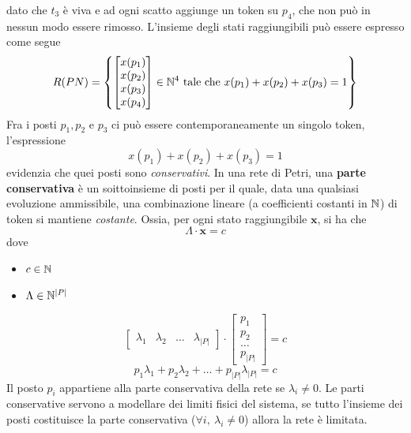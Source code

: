 \documentclass[10pt, letterpaper]{report}
\begin{document}
dato che $t_3$ è viva e ad ogni scatto aggiunge un token su $p_4$, che non può in nessun modo essere rimosso. L'insieme degli stati raggiungibili può essere espresso come segue 
$$ R(PN)= \left\{   \begin{bmatrix}x(p_1)\\x(p_2)\\x(p_3)\\x(p_4) \end{bmatrix} \in {\mathbb N}^4 \text{ tale che }x(p_1)+x(p_2)+x(p_3)=1  \right\}$$
Fra i posti $p_1,p_2$ e $p_3$ ci può essere contemporaneamente un singolo token, l'espressione 
$$ x(p_1)+x(p_2)+x(p_3)=1 $$
evidenzia che quei posti sono \textit{conservativi}. \acc 
{} In una rete di Petri, una \textbf{parte conservativa} è un soittoinsieme di posti per il quale, data una qualsiasi evoluzione ammissibile, una combinazione lineare (a coefficienti costanti in ${\mathbb N}$) di token si mantiene \textit{costante}. Ossia, per ogni stato raggiungibile $\mathbf x$, si ha che 
$$ \Lambda \cdot \mathbf x = c $$
dove \begin{itemize}
\item $c\in {\mathbb N}$\item$ \Lambda \in {\mathbb N}^{|P|}$
\end{itemize}
$$ \begin{bmatrix}
    \lambda_1 & \lambda_2 & \dots & \lambda_{|P|}
\end{bmatrix}\cdot 
\begin{bmatrix}
    p_1 \\ p_2 \\ \dots \\ p_{|P|}
\end{bmatrix}=c$$
$$ p_1\lambda_1+p_2\lambda_2+\dots + p_{|P|} \lambda_{|P|}=c$$
Il posto $p_i$ appartiene alla parte conservativa della rete se $\lambda_i\ne 0$. Le parti conservative servono a modellare dei limiti fisici del sistema, se tutto l'insieme dei posti costituisce la parte conservativa ($\forall i, \ \lambda_i\ne 0$) allora la rete è limitata.
\flowerLine 
\end{document}
